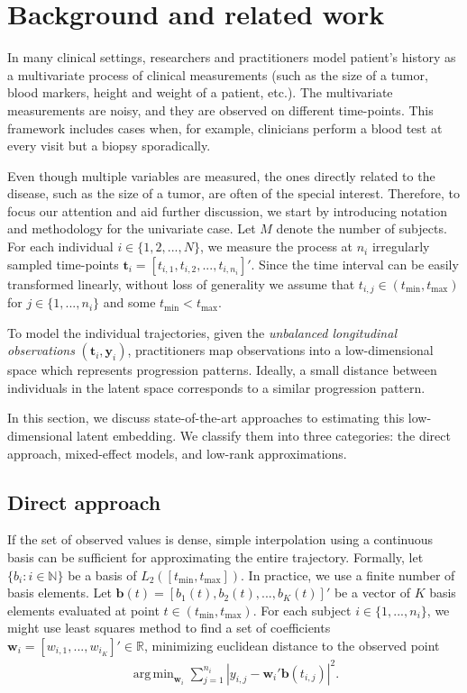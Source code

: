 \documentclass[preprint]{imsart}
\numberwithin{equation}{section}
\theoremstyle{plain}
\newcommand{\R}{\mathbb{R}}
\newcommand{\N}{\mathbb{N}}
\newcommand{\bb}{\mathbf{b}}
\newcommand{\bw}{\mathbf{w}}
\DeclareMathOperator*{\argmin}{arg\,min}
\begin{document}
\section{Background and related work}\label{s:background}

In many clinical settings, researchers and practitioners model patient's history as a multivariate process of clinical measurements (such as the size of a tumor, blood markers, height and weight of a patient, etc.). The multivariate measurements are noisy, and they are observed on different time-points. This framework includes cases when, for example, clinicians perform a blood test at every visit but a biopsy sporadically. 

Even though multiple variables are measured, the ones directly related to the disease, such as the size of a tumor, are often of the special interest. Therefore, to focus our attention and aid further discussion, we start by introducing notation and methodology for the univariate case. Let $M$ denote the number of subjects. For each individual $i \in \{ 1,2,...,N \}$, we measure the process at $n_i$ irregularly sampled time-points $\mathbf{t}_i = [t_{i,1},t_{i,2},...,t_{i,n_i}]'$. Since the time interval can be easily transformed linearly, without loss of generality we assume that $t_{i,j} \in (t_{\min},t_{\max})$ for $ j \in \{1,...,n_i\}$ and some $t_{\min} < t_{\max}$.

To model the individual trajectories, given the {\it unbalanced longitudinal observations} $(\mathbf{t}_i,\mathbf{y}_i)$, practitioners map observations into a low-dimensional space which represents progression patterns. Ideally, a small distance between individuals in the latent space corresponds to a similar progression pattern.

In this section, we discuss state-of-the-art approaches to estimating this low-dimensional latent embedding. We classify them into three categories: the direct approach, mixed-effect models, and low-rank approximations. 

\subsection{Direct approach}\label{ss:direct}

If the set of observed values is dense, simple interpolation using a continuous basis can be sufficient for approximating the entire trajectory. Formally, let $\{b_i: i \in \N \}$ be a basis of $L_2([t_{\min},t_{\max}])$. In practice, we use a finite number of basis elements. Let $\bb(t) = [b_1(t),b_2(t),...,b_K(t)]'$ be a vector of $K$ basis elements evaluated at point $t \in (t_{\min},t_{\max})$. For each subject $i \in \{ 1,...,n_i \}$, we might use least squares method to find a set of coefficients $\bw_i = [w_{i,1},...,w_{i_K}]' \in \R$, minimizing euclidean distance to the observed point
\begin{align}\label{eq:direct-individual}
 \argmin_{\bw_i}\sum_{j=1}^{n_i}\left|y_{i,j} - \bw_i'\bb(t_{i,j})\right|^2.
\end{align}
\end{document}

